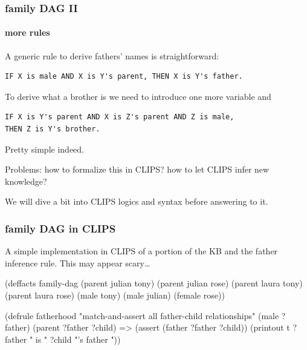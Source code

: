 \documentclass[xcolor={usenames,dvipsnames,svgnames}, compress]{beamer}
\begin{document}
\begin{frame}
  \frametitle{family DAG II}
  \framesubtitle{more rules}

  A generic rule to derive fathers' names is straightforward:
\begin{verbatim}
IF X is male AND X is Y's parent, THEN X is Y's father.
\end{verbatim}

  To derive what a brother is we need to introduce one more variable
  and 
\begin{verbatim}
IF X is Y's parent AND X is Z's parent AND Z is male,
THEN Z is Y's brother.
\end{verbatim}

  
  Pretty simple indeed.\par\bigskip
  
  Problems: how to formalize this in CLIPS? how to let CLIPS
  infer new knowledge?\par\bigskip
  
  We will dive a bit into CLIPS logics and syntax before answering to it.
  
\end{frame}

\begin{frame}[fragile]
  \frametitle{family DAG in CLIPS}

  A simple implementation in CLIPS of a portion of the KB and the father
  inference rule. This may appear scary\dots
  \begin{clips-code}
    (deffacts family-dag
        (parent julian tony)
        (parent julian rose)
        (parent laura tony)
        (parent laura rose)
        (male tony)
        (male julian)
        (female rose))
        
    (defrule fatherhood
    "match-and-assert all father-child relationships"
        (male ?father)
        (parent ?father ?child)
        =>
        (assert (father ?father ?child))
        (printout t ?father " is " ?child "'s father "))
        
  \end{clips-code}
\end{frame}
\end{document}

